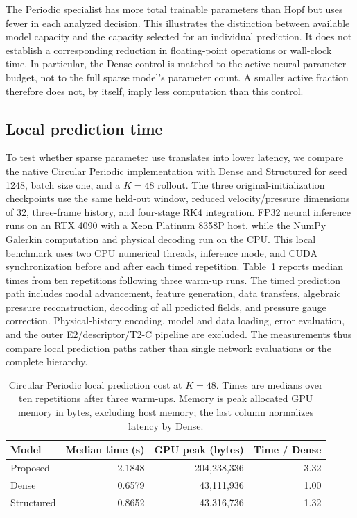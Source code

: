 The Periodic specialist has more total trainable parameters than Hopf
but uses fewer in each analyzed decision. This illustrates the
distinction between available model capacity and the capacity selected
for an individual prediction. It does not establish a corresponding
reduction in floating-point operations or wall-clock time. In particular,
the Dense control is matched to the active neural parameter budget,
not to the full sparse model's parameter count. A smaller active fraction
therefore does not, by itself, imply less computation than this control.

\subsection{Local prediction time}
\label{app:cost_local_latency}

To test whether sparse parameter use translates into lower latency,
we compare the native Circular Periodic implementation with Dense and
Structured for seed 1248, batch size one, and a $K=48$ rollout.
The three original-initialization checkpoints use the same held-out
window, reduced velocity/pressure dimensions of 32, three-frame history,
and four-stage RK4 integration. FP32 neural inference runs on an RTX 4090
with a Xeon Platinum 8358P host, while the NumPy Galerkin computation
and physical decoding run on the CPU. This local benchmark uses two
CPU numerical threads, inference mode, and CUDA synchronization before
and after each timed repetition.
Table~\ref{tab:local_latency} reports median times from ten repetitions
following three warm-up runs. The timed prediction path includes modal
advancement, feature generation, data transfers, algebraic pressure
reconstruction, decoding of all predicted fields, and pressure gauge
correction. Physical-history encoding, model and data loading, error
evaluation, and the outer E2/descriptor/T2-C pipeline are excluded.
The measurements thus compare local prediction paths rather than
single network evaluations or the complete hierarchy.

\begin{table}[tbp]
\centering\small
\caption{Circular Periodic local prediction cost at $K=48$.
Times are medians over ten repetitions after three warm-ups.
Memory is peak allocated GPU memory in bytes, excluding host memory;
the last column normalizes latency by Dense.}
\label{tab:local_latency}
\begin{tabular}{@{}lrrr@{}}
\toprule
Model & Median time (s) & GPU peak (bytes) & Time / Dense\\
\midrule
Proposed & 2.1848 & 204,238,336 & 3.32\\
Dense & 0.6579 & 43,111,936 & 1.00\\
Structured & 0.8652 & 43,316,736 & 1.32\\
\bottomrule
\end{tabular}
\end{table}

